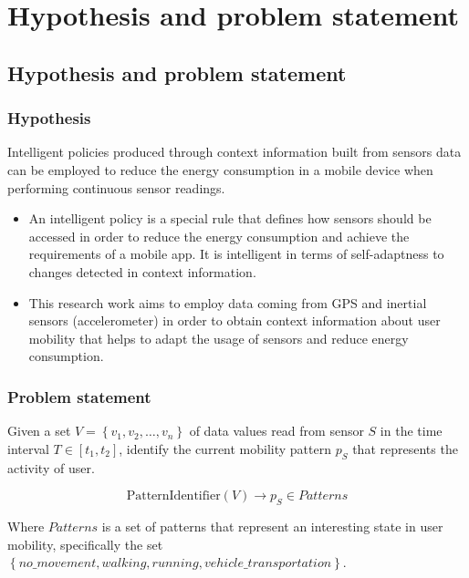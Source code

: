 \documentclass[compress,9pt,xcolor={dvipsnames,table}]{beamer}
\begin{document}
\section{Hypothesis and problem statement}
\subsection{Hypothesis and problem statement}
\begin{frame}\frametitle{Hypothesis}
\begin{tcolorbox}[title=Hypothesis,colframe=PineGreen]
Intelligent policies produced through context information built from sensors data can be employed to reduce the energy consumption in a mobile device when performing continuous sensor readings.
\end{tcolorbox}

{
\small
\begin{itemize}
	\item An intelligent policy is a special rule that defines how sensors should be accessed in order to reduce the energy consumption and achieve the requirements of a mobile app.
	It is intelligent in terms of self-adaptness to changes detected in context information.
	\item This research work aims to employ data coming from GPS and inertial sensors (accelerometer) in order to obtain context information about user mobility that helps to adapt the usage of sensors and reduce energy consumption.
\end{itemize}
}
\end{frame}


\begin{frame}\frametitle{Problem statement}
\begin{tcolorbox}[title=Problem statement: Mobility pattern identification,colframe=PineGreen]
\small
Given a set $V = \left\{v_{1}, v_{2}, \dotsc, v_{n}\right\}$ of data values read from sensor $S$ in the time interval $T  \in [t_{1}, t_{2}]$, identify the current mobility pattern $p_{S}$ that represents the activity of user.

\begin{equation}
  \text{PatternIdentifier}( V ) \longrightarrow{} p_{S} \in Patterns
\end{equation}

Where $Patterns$ is a set of patterns that represent an interesting state in user mobility, specifically the set $\left\{no\_movement, walking, running, vehicle\_transportation\right\}$.
\end{tcolorbox}
\end{frame}
\end{document}
